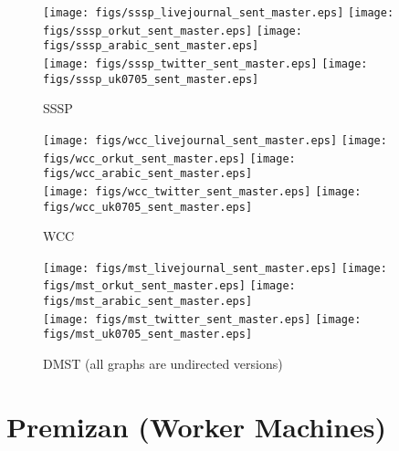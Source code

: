 \documentclass{article}
\newcommand{\bline}[1][1]{\vspace{#1\baselineskip}}
\begin{document}
\begin{figure}[!h]
  \bline[3.5]
  \centering
  \texttt{[image: figs/sssp\_livejournal\_sent\_master.eps]}\hspace{1em}%
  \texttt{[image: figs/sssp\_orkut\_sent\_master.eps]}\hspace{1em}%
  \texttt{[image: figs/sssp\_arabic\_sent\_master.eps]}\\
  \texttt{[image: figs/sssp\_twitter\_sent\_master.eps]}\hspace{1em}%
  \texttt{[image: figs/sssp\_uk0705\_sent\_master.eps]}
  \caption{SSSP}
\end{figure}

\begin{figure}[!h]
  \bline[3.5]
  \centering
  \texttt{[image: figs/wcc\_livejournal\_sent\_master.eps]}\hspace{1em}%
  \texttt{[image: figs/wcc\_orkut\_sent\_master.eps]}\hspace{1em}%
  \texttt{[image: figs/wcc\_arabic\_sent\_master.eps]}\\
  \texttt{[image: figs/wcc\_twitter\_sent\_master.eps]}\hspace{1em}%
  \texttt{[image: figs/wcc\_uk0705\_sent\_master.eps]}
  \caption{WCC}
\end{figure}

\begin{figure}[!h]
  \bline[3.5]
  \centering
  \texttt{[image: figs/mst\_livejournal\_sent\_master.eps]}\hspace{1em}%
  \texttt{[image: figs/mst\_orkut\_sent\_master.eps]}\hspace{1em}%
  \texttt{[image: figs/mst\_arabic\_sent\_master.eps]}\\
  \texttt{[image: figs/mst\_twitter\_sent\_master.eps]}\hspace{1em}%
  \texttt{[image: figs/mst\_uk0705\_sent\_master.eps]}
  \caption{DMST (all graphs are undirected versions)}
\end{figure}

\pagebreak
\section{Premizan (Worker Machines)}
\label{sec:premizan}
\end{document}
